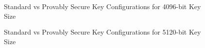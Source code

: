 \documentclass[]{final_report}
\theoremstyle{definition}
\begin{document}
\begin{figure}[H]

    \centering %
     \caption{Standard vs Provably Secure Key Configurations for 4096-bit Key Size}
    \begin{minipage}{\textwidth}
        \centering
        \label{fig:image1}
    \end{minipage}
         \label{keyGen_4096bit_table}
\end{figure}

\begin{figure}[H]

    \centering %
     \caption{Standard vs Provably Secure Key Configurations for 5120-bit Key Size}
    \begin{minipage}{\textwidth}
        \centering
        \label{fig:image1}
    \end{minipage}
         \label{keyGen_5120bit_table}
\end{figure}
\end{document}
